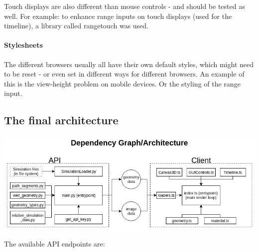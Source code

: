 Touch displays are also different than mouse controls - and should be
tested as well. For example: to enhance range inputs on touch displays
(used for the timeline), a library called rangetouch was used.

\hypertarget{stylesheets}{%
\paragraph{Stylesheets}\label{stylesheets}}

The different browsers usually all have their own default styles, which
might need to be reset - or even set in different ways for different
browsers. An example of this is the view-height problem on mobile
devices. Or the styling of the range input.

\hypertarget{the-final-architecture}{%
\subsection{The final architecture}\label{the-final-architecture}}

\includegraphics{./architecture.png}

The available API endpoints are:

